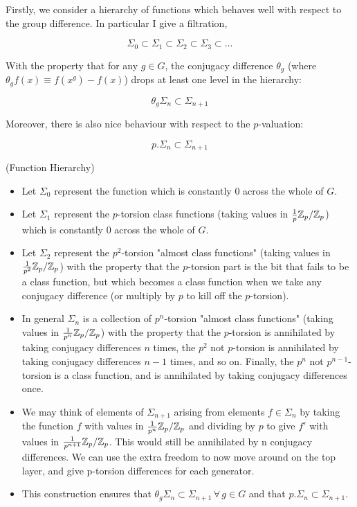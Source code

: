 Firstly, we consider a hierarchy of functions which behaves well with respect to the group difference. In particular I give a filtration, 

$$\Sigma_0 \subset \Sigma_1 \subset \Sigma_2 \subset \Sigma_3 \subset \dots$$ 

With the property that for any $g\in G$, the conjugacy difference $\theta_g$ (where $\theta_g f(x) \equiv f (x^g) - f(x)$) drops at least one level in the hierarchy:

$$\theta_g \Sigma_n \subset \Sigma_{n+1}$$

Moreover, there is also nice behaviour with respect to the $p$-valuation:

$$p. \Sigma_n \subset \Sigma_{n+1}$$

\begin{definition}(Function Hierarchy)
\begin{itemize}
\item Let $\Sigma_0$ represent the function which is constantly $0$ across the whole of $G$.

\item Let $\Sigma_1$ represent the $p$-torsion class functions (taking values in $\frac1p \mathbb Z_p / \mathbb Z_p$) which is constantly $0$ across the whole of $G$.

\item Let $\Sigma_2$ represent the $p^2$-torsion "almost class functions" (taking values in $\frac1{p^2} \mathbb Z_p / \mathbb Z_p$) with the property that the $p$-torsion part is the bit that fails to be a class function, but which becomes a class function when we take any conjugacy difference (or multiply by $p$ to kill off the $p$-torsion).

\item In general $\Sigma_n$ is a collection of $p^n$-torsion "almost class functions" (taking values in $\frac1{p^n} \mathbb Z_p / \mathbb Z_p$) with the property that the $p$-torsion is annihilated by taking conjugacy differences $n$ times, the $p^2$ not $p$-torsion is annihilated by taking conjugacy differences $n-1$ times, and so on. Finally, the $p^n$ not $p^{n-1}$-torsion is a class function, and is annihilated by taking conjugacy differences once.

\item We may think of elements of $\Sigma_{n+1}$ arising from elements $f\in \Sigma_n$ by taking the function $f$ with values in $\frac1{p^n} \mathbb Z_p / \mathbb Z_p$ and dividing by $p$ to give $f'$ with values in $\frac1{p^{n+1}} \mathbb Z_p / \mathbb Z_p$. This would still be annihilated by n conjugacy differences. We can use the extra freedom to now move around on the top layer, and give p-torsion differences for each generator.

\item This construction ensures that $\theta_g \Sigma_n \subset \Sigma_{n+1}\, \forall \, g\in G$ and that $p. \Sigma_n \subset \Sigma_{n+1}$.
\end{itemize}
\end{definition}

